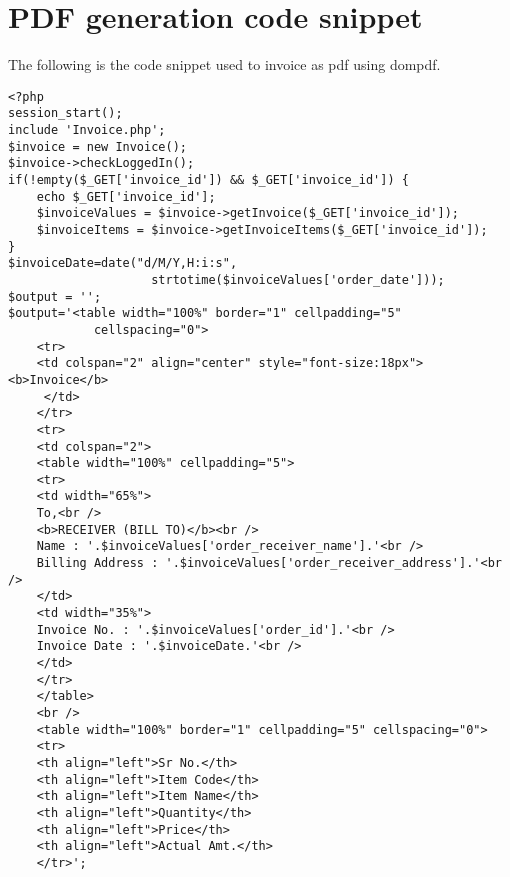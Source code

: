 \chapter{PDF generation code snippet}\label{code}
The following is the code snippet used to invoice as pdf using dompdf.

\begin{verbatim}
<?php
session_start();
include 'Invoice.php';
$invoice = new Invoice();
$invoice->checkLoggedIn();
if(!empty($_GET['invoice_id']) && $_GET['invoice_id']) {
	echo $_GET['invoice_id'];
	$invoiceValues = $invoice->getInvoice($_GET['invoice_id']);		
	$invoiceItems = $invoice->getInvoiceItems($_GET['invoice_id']);		
}
$invoiceDate=date("d/M/Y,H:i:s",
                    strtotime($invoiceValues['order_date']));
$output = '';
$output='<table width="100%" border="1" cellpadding="5" 
            cellspacing="0">
	<tr>
	<td colspan="2" align="center" style="font-size:18px"><b>Invoice</b>
	 </td>
	</tr>
	<tr>
	<td colspan="2">
	<table width="100%" cellpadding="5">
	<tr>
	<td width="65%">
	To,<br />
	<b>RECEIVER (BILL TO)</b><br />
	Name : '.$invoiceValues['order_receiver_name'].'<br /> 
	Billing Address : '.$invoiceValues['order_receiver_address'].'<br />
	</td>
	<td width="35%">         
	Invoice No. : '.$invoiceValues['order_id'].'<br />
	Invoice Date : '.$invoiceDate.'<br />
	</td>
	</tr>
	</table>
	<br />
	<table width="100%" border="1" cellpadding="5" cellspacing="0">
	<tr>
	<th align="left">Sr No.</th>
	<th align="left">Item Code</th>
	<th align="left">Item Name</th>
	<th align="left">Quantity</th>
	<th align="left">Price</th>
	<th align="left">Actual Amt.</th> 
	</tr>';
\end{verbatim}